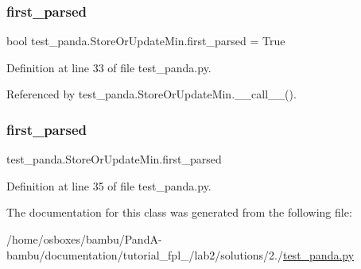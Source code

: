 \subsubsection{\texorpdfstring{first\+\_\+parsed}{first\_parsed}\hspace{0.1cm}{\footnotesize\ttfamily [1/2]}}
{\footnotesize\ttfamily bool test\+\_\+panda.\+Store\+Or\+Update\+Min.\+first\+\_\+parsed = True\hspace{0.3cm}{\ttfamily [static]}}



Definition at line 33 of file test\+\_\+panda.\+py.



Referenced by test\+\_\+panda.\+Store\+Or\+Update\+Min.\+\_\+\+\_\+call\+\_\+\+\_\+().

\mbox{\label{classtest__panda_1_1StoreOrUpdateMin_a97571fb437e445b13cd2bbd9eaf3a664}} 
\subsubsection{\texorpdfstring{first\+\_\+parsed}{first\_parsed}\hspace{0.1cm}{\footnotesize\ttfamily [2/2]}}
{\footnotesize\ttfamily test\+\_\+panda.\+Store\+Or\+Update\+Min.\+first\+\_\+parsed}



Definition at line 35 of file test\+\_\+panda.\+py.



The documentation for this class was generated from the following file\+:\begin{DoxyCompactItemize}
\item 
/home/osboxes/bambu/\+Pand\+A-\/bambu/documentation/tutorial\+\_\+fpl\+\_/lab2/solutions/2./\hyperlink{tutorial__fpl__2017_2lab2_2solutions_22_87_2test__panda_8py}{test\+\_\+panda.\+py}\end{DoxyCompactItemize}
